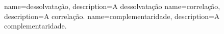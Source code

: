  {
		name={dessolvatação}, 
	description={A dessolvatação}
}
 {
	name={correlação}, 
	description={A correlação.}
}
 {
	name={complementaridade}, 
	description={A complementaridade.}
}
\glsaddall